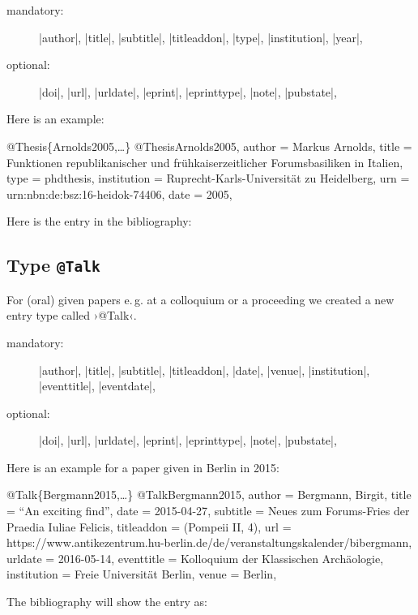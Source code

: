 \documentclass[a4paper,
10pt,
greek,
french,
spanish,
italian,
ngerman,
english,
]{ltxdoc}
\begin{document}
\begin{description}
\item[mandatory:] 
|author|,
|title|, |subtitle|, |titleaddon|,
|type|, |institution|,
|year|,
\item[optional:]
|doi|, |url|, |urldate|, |eprint|, |eprinttype|, |note|, |pubstate|, 
 \end{description}
 

Here is an example:
\begin{bibexample}[label=Arnolds2005]{{@}Thesis\{Arnolds2005,…\}}
@Thesis{Arnolds2005,
  author      = {Markus Arnolds},
  title       = {Funktionen republikanischer und frühkaiserzeitlicher Forumsbasiliken in Italien},
  type        = {phdthesis},
  institution = {Ruprecht-Karls-Universität zu Heidelberg},
  urn      = {urn:nbn:de:bsz:16-heidok-74406},
  date        = {2005},
}
\end{bibexample}

Here is the entry in the bibliography:


 

 \subsection{Type \texttt{@Talk}}\label{talk}
For (oral) given papers e.\,g. at a colloquium or a proceeding we created a new entry type called ›@Talk‹.

\begin{description}
\item[mandatory:] 
|author|,
|title|, |subtitle|, |titleaddon|,
|date|,
|venue|,
|institution|,
|eventtitle|,
|eventdate|,
\item[optional:]
|doi|, |url|, |urldate|, |eprint|, |eprinttype|, |note|, |pubstate|, 
 \end{description}
 
Here is an example for a  paper  given in Berlin in 2015:
\begin{bibexample}[label=Bergmann2015]{{@}Talk\{Bergmann2015,…\}}
@Talk{Bergmann2015,
  author      = {Bergmann, Birgit},
  title       = {\enquote{An exciting find}},
  date        = {2015-04-27},
  subtitle    = {Neues zum Forums-Fries der Praedia Iuliae Felicis},
  titleaddon  = {(Pompeii II, 4)},
  url         = {https://www.antikezentrum.hu-berlin.de/de/veranstaltungskalender/bibergmann},
  urldate     = {2016-05-14},
  eventtitle  = {Kolloquium der Klassischen Archäologie},
  institution = {Freie Universität Berlin},
  venue       = Berlin,
}
\end{bibexample}
The bibliography will show the entry as:
\end{document}
